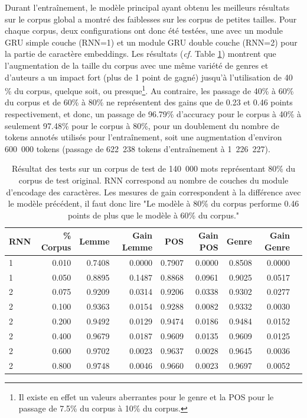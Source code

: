 Durant l'entraînement, le modèle principal ayant obtenu les meilleurs résultats sur le corpus global a montré des faiblesses sur les corpus de petites tailles. Pour chaque corpus, deux configurations ont donc été testées, une avec un module GRU simple couche (RNN=1) et un module GRU double couche (RNN=2) pour la partie de caractère embeddings. Les résultats (\textit{cf.} Table \ref{tab:percent_corpus_comparaison}) montrent que l'augmentation de la taille du corpus avec une même variété de genres et d'auteurs a un impact fort (plus de 1 point de gagné) jusqu'à l'utilisation de 40 \% du corpus, quelque soit, ou presque\footnote{Il existe en effet un valeurs aberrantes pour le genre et la POS pour le passage de 7.5\% du corpus à 10\% du corpus.}. Au contraire, les passage de 40\% à 60\% du corpus et de 60\% à 80\% ne représentent des gains que de 0.23 et 0.46 points respectivement, et donc, un passage de 96.79\% d'accuracy pour le corpus à 40\% à seulement 97.48\% pour le corpus à 80\%, pour un doublement du nombre de tokens annotés utilisés pour l'entraînement, soit une augmentation d'environ 600~000 tokens (passage de 622~238 tokens d'entraînement à 1~226~227).


\begin{table}[]
    \centering
    \begin{tabular}{lrrrrrrrr}
    \toprule
RNN &  \% Corpus &   Lemme &  Gain Lemme &     POS &  Gain POS &    Genre &  Gain Genre \\
\midrule
1 &     0.010 &  0.7408 &      0.0000 &  0.7907 &    0.0000 &  0.8508 &     0.0000 \\
1 &     0.050 &  0.8895 &      0.1487 &  0.8868 &    0.0961 &  0.9025 &     0.0517 \\
2 &     0.075 &  0.9209 &      0.0314 &  0.9206 &    0.0338 &  0.9302 &     0.0277 \\
2 &     0.100 &  0.9363 &      0.0154 &  0.9288 &    0.0082 &  0.9332 &     0.0030 \\
2 &     0.200 &  0.9492 &      0.0129 &  0.9474 &    0.0186 &  0.9484 &     0.0152 \\
2 &     0.400 &  0.9679 &      0.0187 &  0.9609 &    0.0135 &  0.9609 &     0.0125 \\
2 &     0.600 &  0.9702 &      0.0023 &  0.9637 &    0.0028 &  0.9645 &     0.0036 \\
2 &     0.800 &  0.9748 &      0.0046 &  0.9660 &    0.0023 &  0.9697 &     0.0052 \\
    \bottomrule
    \end{tabular}
    \caption{Résultat des tests sur un corpus de test de 140~000 mots représentant 80\% du corpus de test original. RNN correspond au nombre de couches du module d'encodage des caractères. Les mesures de gain correspondent à la différence avec le modèle précédent, il faut donc lire "Le modèle à 80\% du corpus performe 0.46 points de plus que le modèle à 60\% du corpus."}
    \label{tab:percent_corpus_comparaison}
\end{table}

